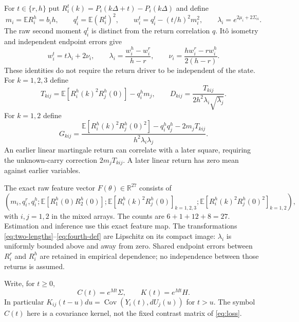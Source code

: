 \documentclass[11pt,a4paper]{amsart}
\theoremstyle{plain}
\theoremstyle{definition}
\theoremstyle{remark}
\DeclareMathOperator{\Cov}{Cov}
\newcommand{\R}{\mathbb{R}}
\newcommand{\EE}{\mathbb{E}}
\begin{document}
For $t\in\{r,h\}$ put
$R_i^t(k)=P_i(k\Delta+t)-P_i(k\Delta)$ and define
\[
 m_i=\EE R_i^h=b_ih,\qquad q_i^t=\EE(R_i^t)^2,\qquad
 w_i^t=q_i^t-(t/h)^2m_i^2,\qquad
 \lambda_i=e^{2\mu_i+2\Sigma_{ii}}.
\]
The raw second moment $q_i^t$ is distinct from the return correlation $q$.
It\^o isometry and independent endpoint errors give
\begin{equation}\label{eq:two-lengths}
 w_i^t=t\lambda_i+2\nu_i,\qquad
 \lambda_i=\frac{w_i^h-w_i^r}{h-r},\qquad
 \nu_i=\frac{h w_i^r-r w_i^h}{2(h-r)}.
\end{equation}
These identities do not require the return driver to be independent of
the state. For $k=1,2,3$ define
\begin{equation}\label{eq:cubic-def}
 T_{kij}=\EE[R_i^h(k)^2R_j^h(0)]-q_i^h m_j,\qquad
 D_{kij}=\frac{T_{kij}}{2h^2\lambda_i\sqrt{\lambda_j}}.
\end{equation}
For $k=1,2$ define
\begin{equation}\label{eq:fourth-def}
 G_{kij}=\frac{\EE[R_i^h(k)^2R_j^h(0)^2]-q_i^h q_j^h
                      -2m_jT_{kij}}{h^2\lambda_i\lambda_j}.
\end{equation}
An earlier linear martingale return can correlate with a later square,
requiring the unknown-carry correction $2m_jT_{kij}$. A later linear return
has zero mean against earlier variables.

The exact raw feature vector $F(\theta)\in\R^{27}$ consists of
\begin{equation}\label{eq:raw-features}
 \left(m_i,q_i^r,q_i^h; \EE[R_1^h(0)R_2^h(0)]; \EE[R_i^h(k)^2R_j^h(0)]_{k=1,2,3}; \EE[R_i^h(k)^2R_j^h(0)^2]_{k=1,2}\right),
\end{equation}
with $i,j=1,2$ in the mixed arrays. The counts are $6+1+12+8=27$.
Estimation and inference use this exact feature map.
The transformations \eqref{eq:two-lengths}--\eqref{eq:fourth-def} are
Lipschitz on its compact image: $\lambda_i$ is uniformly bounded above
and away from zero. Shared endpoint errors between $R_i^r$ and $R_i^h$
are retained in empirical dependence; no independence between those
returns is assumed.

Write, for $t\ge0$,
\begin{equation}\label{eq:cov-loading}
 C(t)=e^{Mt}\Sigma,\qquad K(t)=e^{Mt}H.
\end{equation}
In particular $K_{ij}(t-u)du=\Cov(Y_i(t),dU_j(u))$ for $t>u$.
The symbol $C(t)$ here is a covariance kernel, not the fixed contrast
matrix of \eqref{eq:loss}.
\end{document}
